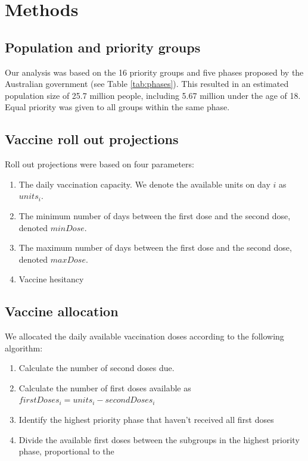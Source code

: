 \documentclass{article}
\begin{document}
\hypertarget{methods}{%
\section{Methods}\label{methods}}

\hypertarget{population-and-priority-groups}{%
\subsection{Population and priority
groups}\label{population-and-priority-groups}}

Our analysis was based on the 16 priority groups and five phases
proposed by the Australian government (see Table \ref{tab:phases}). This
resulted in an estimated population size of 25.7 million people,
including 5.67 million under the age of 18. Equal priority was given to
all groups within the same phase.

\hypertarget{vaccine-roll-out-projections}{%
\subsection{Vaccine roll out
projections}\label{vaccine-roll-out-projections}}

Roll out projections were based on four parameters:

\begin{enumerate}
\def\labelenumi{\arabic{enumi}.}
\tightlist
\item
  The daily vaccination capacity. We denote the available units on day
  \(i\) as \(units_i\).
\item
  The minimum number of days between the first dose and the second dose,
  denoted \(minDose\).
\item
  The maximum number of days between the first dose and the second dose,
  denoted \(maxDose\).
\item
  Vaccine hesitancy
\end{enumerate}

\hypertarget{vaccine-allocation}{%
\subsection{Vaccine allocation}\label{vaccine-allocation}}

We allocated the daily available vaccination doses according to the
following algorithm:

\begin{enumerate}
\def\labelenumi{\arabic{enumi}.}
\item
  Calculate the number of second doses due.
\item
  Calculate the number of first doses available as
  \(firstDoses_i = units_i - secondDoses_i\)
\item
  Identify the highest priority phase that haven't received all first
  doses
\item
  Divide the available first doses between the subgroups in the highest
  priority phase, proportional to the
\end{enumerate}
\end{document}

